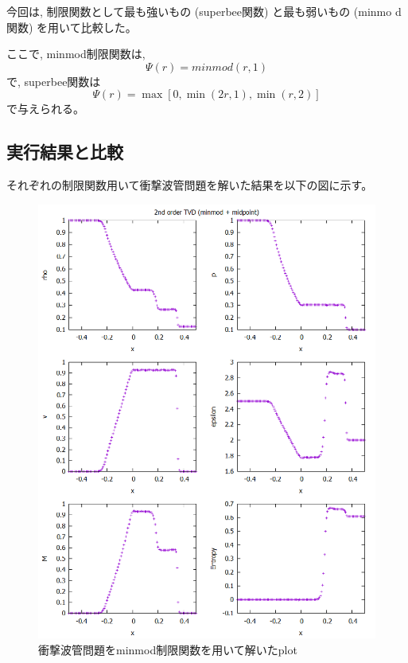\documentclass[dvipdfmx,b5paper]{jsarticle}
\begin{document}
今回は, 制限関数として最も強いもの (superbee関数) と最も弱いもの (minmo
d関数) を用いて比較した。

ここで, minmod制限関数は, 
\begin{equation}
  \Psi(r)=minmod(r, 1)
\end{equation}
で, superbee関数は
\begin{equation}
  \Psi(r)=\max[0, \min(2r, 1), \min(r, 2)]
\end{equation}
で与えられる。

\subsection{実行結果と比較}
それぞれの制限関数用いて衝撃波管問題を解いた結果を以下の図に示す。

\begin{figure}[H]
  \centering
  \includegraphics[width = 0.8\linewidth]{../book/chap03/10_shock-tube-minmod/01.png}
  \caption{衝撃波管問題をminmod制限関数を用いて解いたplot}
  \label{fig:minmod}
\end{figure}
\end{document}
